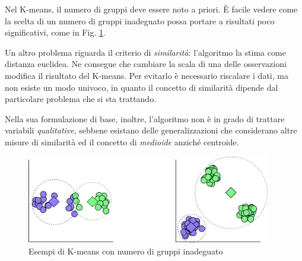 \documentclass[a4paper, 10pt]{report}
\begin{document}
Nel K-means, il numero di gruppi deve essere noto a priori. È facile
vedere come la scelta di un numero di gruppi inadeguato possa portare
a risultati poco significativi, come in Fig. \ref{fig:kmeans}.

Un altro problema riguarda il criterio di \emph{similarità}: l'algoritmo
la stima come distanza euclidea. Ne consegue che cambiare la scala di
una delle osservazioni modifica il risultato del K-means. Per evitarlo
è necessario riscalare i dati, ma non esiste un modo univoco, in quanto
il concetto di similarità dipende dal particolare problema che si sta
trattando.

Nella sua formulazione di base, inoltre, l'algoritmo non è in grado di
trattare variabili \emph{qualitative}, sebbene esistano delle
generalizzazioni che considerano altre misure di similarità ed il concetto
di \emph{medioide} anziché centroide.

\begin{figure}
  \centering
  \includegraphics[width=0.95\textwidth]{imgs/kmeans.png}
  \caption{Esempi di K-means con numero di gruppi inadeguato}
  \label{fig:kmeans}
\end{figure}



\nocite{azzalini2012data}
\nocite{hastie2013introduction}
\nocite{hastie2005elements}


\end{document}
